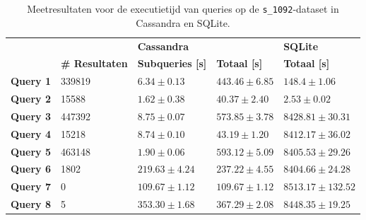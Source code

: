 \begin{table}[h]
\centering
\begin{tabular}{@{}lllll@{}}
\cmidrule(l){3-5}
                              &         & \multicolumn{2}{|l|}{\textbf{Cassandra}}                                                      & \multicolumn{1}{l|}{\textbf{SQLite}}                             \\ 
\cmidrule(l){2-5}
\multicolumn{1}{l|}{}  & \multicolumn{1}{l|}{\textbf{\# Resultaten}}               & \multicolumn{1}{l|}{\textbf{Subqueries [s]}} & \multicolumn{1}{l|}{\textbf{Totaal [s]}} & \multicolumn{1}{l|}{\textbf{Totaal [s]}} \\ \midrule
\multicolumn{1}{|l|}{\textbf{Query 1}} & \multicolumn{1}{l|}{339819} & \multicolumn{1}{l|}{$6.34 \pm 0.13$}             & \multicolumn{1}{l|}{$443.46 \pm 6.85$}          & \multicolumn{1}{l|}{$148.4 \pm 1.06$}                          \\
\multicolumn{1}{|l|}{\textbf{Query 2}} & \multicolumn{1}{l|}{15588} & \multicolumn{1}{l|}{$1.62 \pm 0.38$}             & \multicolumn{1}{l|}{$40.37 \pm 2.40$}          & \multicolumn{1}{l|}{$2.53 \pm 0.02$}                          \\
\multicolumn{1}{|l|}{\textbf{Query 3}} & \multicolumn{1}{l|}{447392} &\multicolumn{1}{l|}{$8.75 \pm 0.07$}            & \multicolumn{1}{l|}{$573.85 \pm 3.78$}          & \multicolumn{1}{l|}{$8428.81 \pm 30.31$}                        \\
\multicolumn{1}{|l|}{\textbf{Query 4}} & \multicolumn{1}{l|}{15218} &\multicolumn{1}{l|}{$8.74 \pm 0.10$}            & \multicolumn{1}{l|}{$43.19 \pm 1.20$}            & \multicolumn{1}{l|}{$8412.17 \pm 36.02$}                        \\
\multicolumn{1}{|l|}{\textbf{Query 5}} & \multicolumn{1}{l|}{463148} &\multicolumn{1}{l|}{$1.90 \pm 0.06$}            & \multicolumn{1}{l|}{$593.12 \pm 5.09$}           & \multicolumn{1}{l|}{$8405.53 \pm 29.26$}                        \\
\multicolumn{1}{|l|}{\textbf{Query 6}} & \multicolumn{1}{l|}{1802} &\multicolumn{1}{l|}{$219.63 \pm 4.24$}                 & \multicolumn{1}{l|}{$237.22 \pm 4.55$}                    & \multicolumn{1}{l|}{$8404.66 \pm 24.28$}                        \\
\multicolumn{1}{|l|}{\textbf{Query 7}} & \multicolumn{1}{l|}{0} &\multicolumn{1}{l|}{$109.67 \pm 1.12$}          & \multicolumn{1}{l|}{$109.67 \pm 1.12$}           & \multicolumn{1}{l|}{$8513.17 \pm 132.52$}                        \\
\multicolumn{1}{|l|}{\textbf{Query 8}} & \multicolumn{1}{l|}{5} &\multicolumn{1}{l|}{$353.30 \pm 1.68$} & \multicolumn{1}{l|}{$367.29 \pm 2.08$}       & \multicolumn{1}{l|}{$8448.35 \pm 19.25$}                                \\ 
\bottomrule
\end{tabular}
\caption{Meetresultaten voor de executietijd van queries op de \texttt{s\_1092}-dataset in Cassandra en SQLite.}
\end{table}

